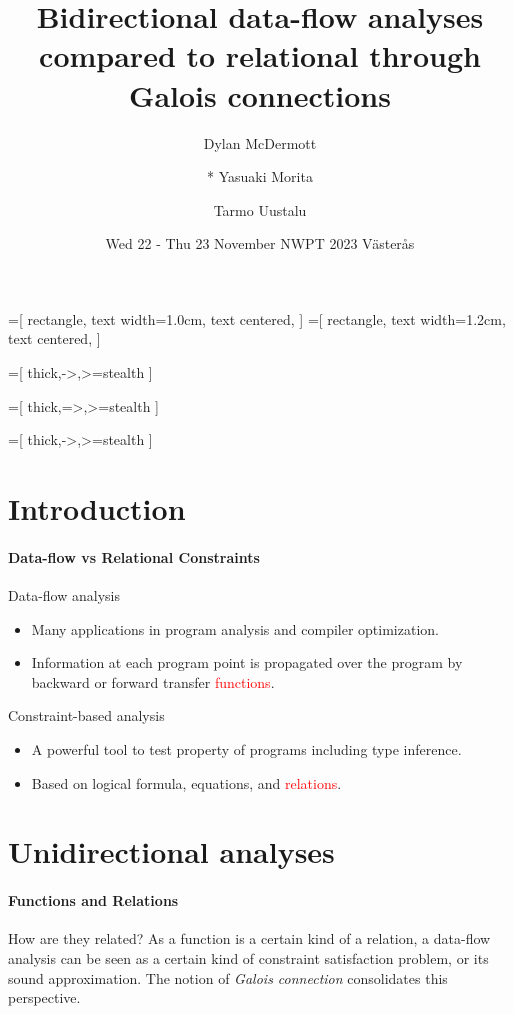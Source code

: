 \documentclass{llncs}
\title{Bidirectional data-flow analyses compared to relational through Galois connections}
\author{
  Dylan McDermott
\and
  * Yasuaki Morita
\and
  Tarmo Uustalu
}
\institute{Reykjavik University}
\date{Wed 22 - Thu 23 November NWPT 2023 V{\"a}ster{\aa}s }
\newcommand{\red}[1]{\textcolor{red}{#1}}
\begin{document}
\usetikzlibrary{shapes,arrows}

=[
  rectangle,
  text width=1.0cm,
  text centered,
]
=[
  rectangle,
  text width=1.2cm,
  text centered,
]

=[
  thick,->,>=stealth
]

=[
  thick,=>,>=stealth
]

=[
  thick,->,>=stealth
]


  
\section{Introduction}

\paragraph{Data-flow vs Relational Constraints}
Data-flow analysis
    \begin{itemize}
    \item Many applications in program analysis and compiler optimization.
    \item Information at each program point is propagated over the program by backward or forward transfer \red{functions}.
    \end{itemize}


Constraint-based analysis
    \begin{itemize}
    \item A powerful tool to test property of programs including type inference.
    \item Based on logical formula, equations, and \red{relations}.
    \end{itemize}

    
\section{Unidirectional analyses}

  \paragraph{Functions and Relations}
  How are they related?
    As a function is a certain kind of a relation,
    a data-flow analysis can be seen as a certain kind of constraint satisfaction problem, or its sound approximation.
    The notion of \emph{Galois connection} consolidates this perspective.
  
\end{document}
